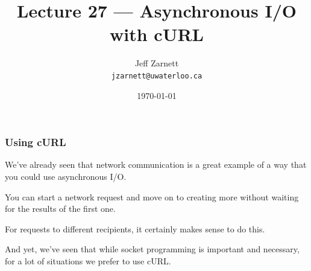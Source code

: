 

\title{Lecture 27 --- Asynchronous I/O with cURL }

\author{Jeff Zarnett \\ \small \texttt{jzarnett@uwaterloo.ca}}
\date{\today}




\begin{frame}
	\titlepage

\end{frame}

\begin{frame}
	\frametitle{Using cURL}

	We've already seen that network communication is a great example of a way that you could use asynchronous I/O.

	You can start a network request and move on to creating more without waiting for the results of the first one.

	For requests to different recipients, it certainly makes sense to do this.

	And yet, we've seen that while socket programming is important and necessary, for a lot of situations we prefer to use cURL.

\end{frame}


